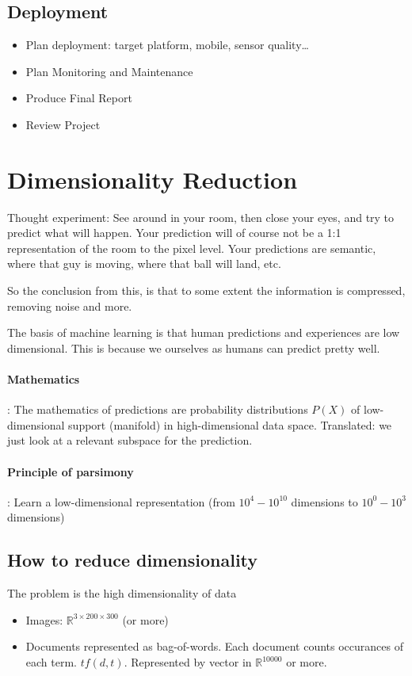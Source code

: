 \documentclass{article}
\begin{document}
\subsection{Deployment}
\begin{itemize}
  \item Plan deployment: target platform, mobile, sensor quality\dots
  \item Plan Monitoring and Maintenance
  \item Produce Final Report
  \item Review Project
\end{itemize}

\section{Dimensionality Reduction}
Thought experiment: See around in your room, then close your eyes, and try to predict what will happen. Your prediction will of course not be a 1:1 representation of the room to the pixel level. Your predictions are semantic, where that guy is moving, where that ball will land, etc.

So the conclusion from this, is that to some extent the information is compressed, removing noise and more.

The basis of machine learning is that human predictions and experiences are low dimensional. This is because we ourselves as humans can predict pretty well.

\paragraph{Mathematics}: The mathematics of predictions are probability distributions $P(X)$ of low-dimensional support (manifold) in high-dimensional data space. Translated: we just look at a relevant subspace for the prediction. 

\paragraph{Principle of parsimony}: Learn a low-dimensional representation (from $10^4-10^{10}$ dimensions to $10^0-10^3$ dimensions)

\subsection{How to reduce dimensionality}
The problem is the high dimensionality of data
\begin{itemize}
  \item Images: $\mathbb{R}^{3\times 200\times 300}$ (or more)
  \item Documents represented as bag-of-words. Each document counts occurances of each term. $tf(d,t)$. Represented by vector in $\mathbb{R}^{10000}$ or more.
\end{itemize}
\end{document}
